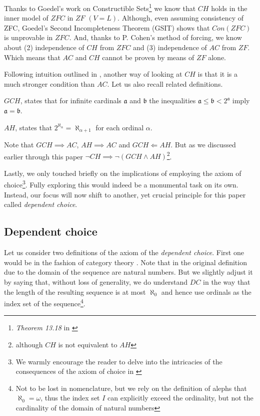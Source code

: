 Thanks to Goedel's work on Constructible Sets\footnote{\textit{Theorem 13.18} in \cite{jech2003set}} we know that $CH$ holds in the inner model of $ZFC$ in $ZF$ $(V=L)$. Although, even assuming consistency of ZFC, Goedel's Second Incompleteness Theorem (GSIT) shows that $Con(ZFC)$ is unprovable in $ZFC$. And, thanks to P. Cohen's method of forcing, we know about (2) independence of $CH$ from $ZFC$ and (3) independence of $AC$ from $ZF$. Which means that $AC$ and $CH$ cannot be proven by means of $ZF$ alone.

Following intuition outlined in \cite{herrlich2006ac}, another way of looking at $CH$ is that it is a much stronger condition than $AC$. Let us also recall related definitions.
\begin{definition}
  $GCH$, states that for infinite cardinals $\mathfrak{a}$ and $\mathfrak{b}$ the inequalities $\mathfrak{a} \leq \mathfrak{b} < 2^\mathfrak{a}$ imply $\mathfrak{a} = \mathfrak{b}$.
\end{definition}
\begin{definition}
  $AH$, states that $2^{\aleph_\alpha} = \aleph_{\alpha+1}$ for each ordinal $\alpha$.
\end{definition}

Note that $GCH \implies AC$, $AH \implies AC$ and $GCH \Longleftarrow AH$. But as we discussed earlier through this paper $\neg CH \implies \neg ( GCH \land AH)$\footnote{although $CH$ is not equivalent to $AH$}.

Lastly, we only touched briefly on the implications of employing the axiom of choice\footnote{We warmly encourage the reader to delve into the intricacies of the consequences of the axiom of choice in \cite{Jech1973AboutTA,Howard1998ConsequencesOT,Blass2005HowardPA}}. Fully exploring this would indeed be a monumental task on its own. Instead, our focus will now shift to another, yet crucial principle for this paper called \textit{dependent choice}.

\subsection{Dependent choice}

Let us consider two definitions of the axiom of the \textit{dependent choice}. First one would be in the fashion of category theory \cite{nlab:dependent_choice}. Note that in the original definition due to \cite{nlab:dependent_choice} the domain of the sequence are natural numbers. But we slightly adjust it by saying that, without loss of generality, we do understand $DC$ in the way that the length of the resulting sequence is at most $\aleph_0$ and hence use ordinals as the index set of the sequence\footnote{Not to be lost in nomenclature, but we rely on the definition of alephs that $\aleph_0 = \omega$, thus the index set $I$ can explicitly exceed the ordinality, but not the cardinality of the domain of natural numbers}.


